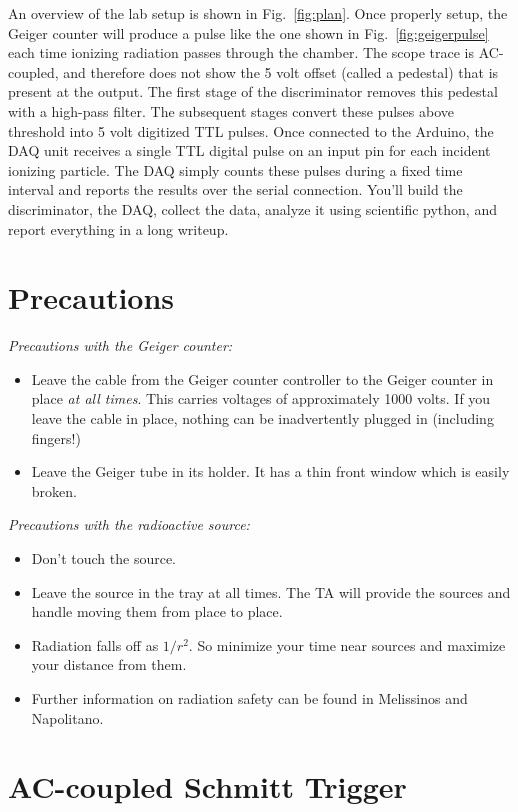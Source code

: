 \documentclass[12pt]{article}
\begin{document}
An overview of the lab setup is shown in Fig.~\ref{fig:plan}.  Once
properly setup, the Geiger counter will produce a pulse like the one
shown in Fig.~\ref{fig:geigerpulse} each time ionizing radiation
passes through the chamber.  The scope trace is AC-coupled, and
therefore does not show the 5 volt offset (called a pedestal) that is
present at the output.  The first stage of the discriminator removes
this pedestal with a high-pass filter.  The subsequent stages convert
these pulses above threshold into 5 volt digitized TTL pulses.  Once
connected to the Arduino, the DAQ unit receives a single TTL digital
pulse on an input pin for each incident ionizing particle.  The DAQ
simply counts these pulses during a fixed time interval and reports
the results over the serial connection.  You'll build the
discriminator, the DAQ, collect the data, analyze it using scientific
python, and report everything in a long writeup.

\section{Precautions}

\noindent
{\em Precautions with the Geiger counter:}
\begin{itemize}
\item Leave the cable from the Geiger counter controller to the Geiger counter in place {\em at all times}.  This carries voltages of approximately 1000 volts.  If you leave the cable in place, nothing can be inadvertently plugged in (including fingers!)
\item Leave the Geiger tube in its holder.  It has a thin front window which is easily broken.
\end{itemize}

\noindent
{\em Precautions with the radioactive source:}
\begin{itemize}
\item Don't touch the source.
\item Leave the source in the tray at all times.  The TA will provide the sources and handle moving them from place to place.
\item Radiation falls off as $1/r^2$.  So minimize your time near sources and maximize your distance from them.
\item Further information on radiation safety can be found in Melissinos and Napolitano.
\end{itemize}

\section{AC-coupled Schmitt Trigger}
\end{document}
